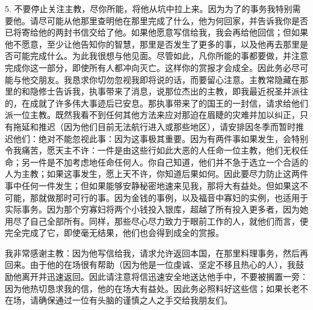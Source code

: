5. 不要停止关注主教，尽你所能，将他从坑中拉上来。因为为了的事务我特别需要他。请尽可能从他那里查明他在那里完成了什么，他为何回家，并告诉我你是否已将寄给他的两封书信交给了他。如果他愿意写信给我，我会再给他回信；但如果他不愿意，至少让他告知你的智慧，那里是否发生了更多的事，以及他再去那里是否可能完成什么。为此我很想与他见面。尽管如此，凡你所能的事都要做，并注意完成你这一部分，即使所有人都冲向灭亡。这样你的赏报才会成全。因此务必尽可能与他交朋友。我恳求你切勿忽视我即将说的话，而要留心注意。主教常隐藏在那里的和隐修士告诉我，执事带来了消息，说那位杰出的主教，即我最近祝圣并派往的，在成就了许多伟大事迹后已安息。那执事带来了的国王的一封信，请求给他们派一位主教。既然我看不到任何其他方法来应对那迫在眉睫的灾难并加以纠正，只有拖延和推迟（因为他们目前无法航行进入或那些地区），请安排因冬季而暂时推迟他们：绝对不能忽视此事：因为这事极其重要。因为有两件事如果发生，会特别令我痛苦，愿天主不许：一件是由这些行如此大恶的人任命一位主教，他们无权任命；另一件是不加考虑地任命任何人。你自己知道，他们并不急于选立一个合适的人为主教；如果这事发生，愿上天不许，你知道后果如何。因此要尽力防止这两件事中任何一件发生；但如果能够安静秘密地速来见我，那将大有益处。但如果这不可能，那就做那时可行的事。因为金钱的事例，以及福音中寡妇的实例，也适用于实际事务。因为那个穷寡妇将两个小钱投入银库，超越了所有投入更多者，因为她用尽了自己全部所有。同样，那些尽心尽力致力于眼前工作的人，就他们而言，便完全完成了它，即使毫无结果，他们也会得到成全的赏报。\par

我非常感谢主教：因为他写信给我，请求允许返回本国，在那里料理事务，然后再回来。由于他的在场很有帮助（因为他是一位虔诚、坚定不移且热心的人），我鼓励他离开并迅速返回。因此请注意将信迅速安全地送达他手中，不要被搁置一旁：因为他热切恳求我的信，他的在场大有益处。因此务必照料好这些信；如果长老不在场，请确保通过一位有头脑的谨慎之人之手交给我朋友们。\par


